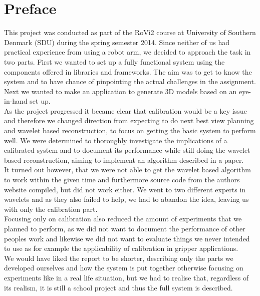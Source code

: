 \chapter*{Preface}
This project was conducted as part of the RoVi2 course at University of Southern Denmark (SDU) during the spring semester 2014. Since neither of us had practical experience from using a robot arm, we decided to approach the task in two parts. First we wanted to set up a fully functional system using the components offered in libraries and frameworks. The aim was to get to know the system and to have chance of pinpointing the actual challenges in the assignment. Next we wanted to make an application to generate 3D models based on an eye-in-hand set up.\\

As the project progressed it became clear that calibration would be a key issue and therefore we changed direction from expecting to do next best view planning and wavelet based reconstruction, to focus on getting the basic system to perform well. We were determined to thoroughly investigate the implications of a calibrated system and to document its performance while still doing the wavelet based reconstruction, aiming to implement an algorithm described in a paper. \\

It turned out however, that we were not able to get the wavelet based algorithm to work within the given time and furthermore source code from the authors website compiled, but did not work either. We went to two different experts in wavelets and as they also failed to help, we had to abandon the idea, leaving us with only the calibration part. \\

Focusing only on calibration also reduced the amount of experiments that we planned to perform, as we did not want to document the performance of other peoples work and likewise we did not want to evaluate things we never intended to use as for example the applicability of calibration in gripper applications. \\

We would have liked the report to be shorter, describing only the parts we developed ourselves and how the system is put together otherwise focusing on experiments like in a real life situation, but we had to realise that, regardless of its realism, it is still a school project and thus the full system is described.\\

